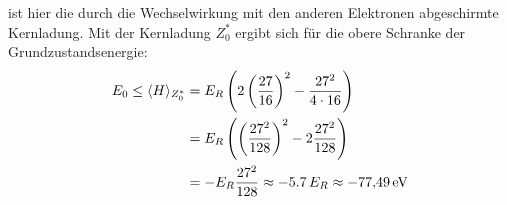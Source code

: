         \justifying ist hier die durch die Wechselwirkung mit den anderen Elektronen abgeschirmte Kernladung. Mit der Kernladung $Z_0^*$ ergibt sich
        für die obere Schranke der Grundzustandsenergie: 
    \begin{align}
        E_0 \leq \langle H \rangle_{Z_0^*} &= E_R\left( 2\left( \frac{27}{16} \right)^2 - \frac{27^2}{4\cdot 16} \right)\\
        &= E_R\left( \left( \frac{27^2}{128} \right)^2 - 2\frac{27^2}{128} \right)\\
        &= -E_R \frac{27^2}{128} \approx -5.7\,E_R \approx -\text{\SI{77.49}{\electronvolt}}
    \end{align} 


